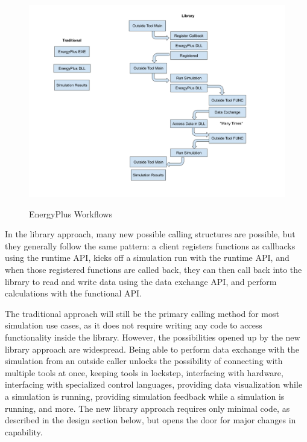 \documentclass[5p, authoryear]{elsarticle}
\begin{document}
\begin{figure}
\begin{center}
\label{figure:api:uses:workflows}
\includegraphics[width=\columnwidth]{images/api_workflows.png}
\caption{EnergyPlus Workflows}
\end{center}
\end{figure}

In the library approach, many new possible calling structures are possible, but they generally follow the same pattern: a client registers functions as callbacks using the runtime API, kicks off a simulation run with the runtime API, and when those registered functions are called back, they can then call back into the library to read and write data using the data exchange API, and perform calculations with the functional API.

The traditional approach will still be the primary calling method for most simulation use cases, as it does not require writing any code to access functionality inside the library.  However, the possibilities opened up by the new library approach are widespread.  Being able to perform data exchange with the simulation from an outside caller unlocks the possibility of connecting with multiple tools at once, keeping tools in lockstep, interfacing with hardware, interfacing with specialized control languages, providing data visualization while a simulation is running, providing simulation feedback while a simulation is running, and more.  The new library approach requires only minimal code, as described in the design section below, but opens the door for major changes in capability.
\end{document}
